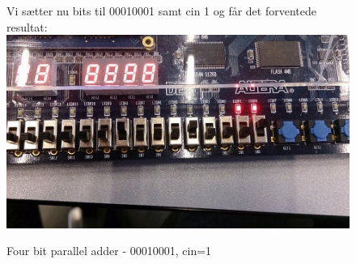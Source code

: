 \begin{enumerate}
	\begin{figure}[H]
			Vi sætter nu bits til 00010001 samt cin 1 og får det forventede resultat:
			\centering
			\includegraphics[scale=0.5]{pictures/Oevelse3/00010001_cin1.jpg}
			\caption{Four bit parallel adder - 00010001, cin=1}
			\label{fig:4bitFa00010001cin1}
		\end{figure}
		
\end{enumerate}